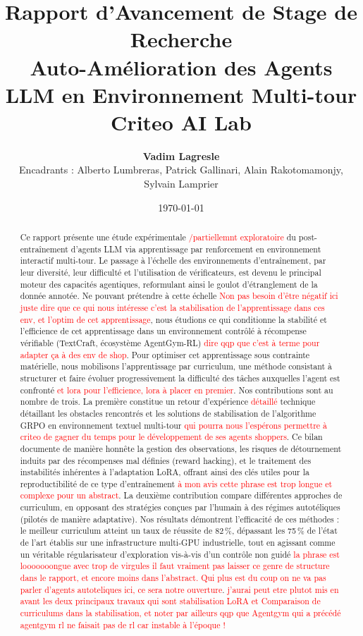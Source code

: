\documentclass[11pt,a4paper]{article}
\title{\Large \textbf{Rapport d'Avancement de Stage de Recherche}\\ \huge \textbf{Auto-Amélioration des Agents LLM en Environnement Multi-tour}\\ \large Criteo AI Lab}
\author{\textbf{Vadim Lagresle} \\ Encadrants : Alberto Lumbreras, Patrick Gallinari, Alain Rakotomamonjy, Sylvain Lamprier}
\date{\today}
\begin{document}
\maketitle

\vspace{2cm}
\begin{abstract}
\noindent Ce rapport présente une étude expérimentale \textcolor{red}{/partiellemnt exploratoire} du post-entraînement d'agents LLM via apprentissage par renforcement en environnement interactif multi-tour. Le passage à l'échelle des environnements d'entraînement, par leur diversité, leur difficulté et l'utilisation de vérificateurs, est devenu le principal moteur des capacités agentiques, reformulant ainsi le goulot d'étranglement de la donnée annotée. Ne pouvant prétendre à cette échelle \textcolor{red}{Non pas besoin d'être négatif ici juste dire que ce qui nous intéresse c'est la stabilisation de l'apprentissage dans ces env, et l'optim de cet apprentissage}, nous étudions ce qui conditionne la stabilité et l'efficience de cet apprentissage dans un environnement contrôlé à récompense vérifiable (TextCraft, écosystème AgentGym-RL) \textcolor{red}{dire qqp que c'est à terme pour adapter ça à des env de shop}. Pour optimiser cet apprentissage sous contrainte matérielle, nous mobilisons l'apprentissage par curriculum, une méthode consistant à structurer et faire évoluer progressivement la difficulté des tâches auxquelles l'agent est confronté \textcolor{red}{et lora pour l'efficience, lora à placer en premier}. Nos contributions sont au nombre de trois. La première constitue un retour d'expérience \textcolor{red}{détaillé} technique détaillant les obstacles rencontrés et les solutions de stabilisation de l'algorithme GRPO en environnement textuel multi-tour \textcolor{red}{qui pourra nous l'espérons permettre à criteo de gagner du temps pour le développement de ses agents shoppers}. Ce bilan documente de manière honnête la gestion des observations, les risques de détournement induits par des récompenses mal définies (reward hacking), et le traitement des instabilités inhérentes à l'adaptation LoRA, offrant ainsi des clés utiles pour la reproductibilité de ce type d'entraînement \textcolor{red}{à mon avis cette phrase est trop longue et complexe pour un abstract}. La deuxième contribution compare différentes approches de curriculum, en opposant des stratégies conçues par l'humain à des régimes autotéliques (pilotés de manière adaptative). Nos résultats démontrent l'efficacité de ces méthodes : le meilleur curriculum atteint un taux de réussite de 82\,\%, dépassant les 75\,\% de l'état de l'art établis sur une infrastructure multi-GPU industrielle, tout en agissant comme un véritable régularisateur d'exploration vis-à-vis d'un contrôle non guidé \textcolor{red}{la phrase est looooooongue avec trop de virgules il faut vraiment pas laisser ce genre de structure dans le rapport, et encore moins dans l'abstract. Qui plus est du coup on ne va pas parler d'agents autoteliques ici, ce sera notre ouverture}. \textcolor{red}{j'aurai peut etre plutot mis en avant les deux principaux travaux qui sont stabilisation LoRA et Comparaison de curriculums dans la stabilisation, et noter par ailleurs qqp que Agentgym qui a précédé agentgym rl ne faisait pas de rl car instable à l'époque !}

\end{abstract}
\end{document}
